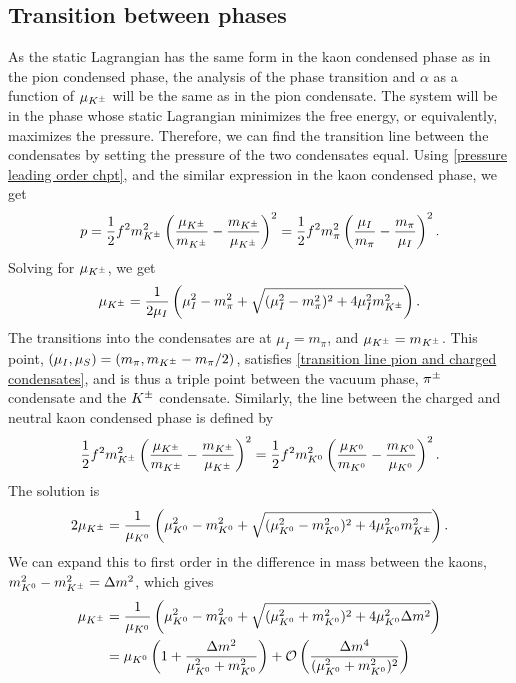 \subsection{Transition between phases}


As the static Lagrangian has the same form in the kaon condensed phase as in the pion condensed phase, the analysis of the phase transition and $\alpha$ as a function of $\mu_{K^\pm}$ will be the same as in the pion condensate.
The system will be in the phase whose static Lagrangian minimizes the free energy, or equivalently, maximizes the pressure.
Therefore, we can find the transition line between the condensates by setting the pressure of the two condensates equal.
Using \autoref{pressure leading order chpt}, and the similar expression in the kaon condensed phase, we get
%
\begin{equation}
    p 
    = \frac{1}{2} f^2 m_{K^\pm}^2 \left( \frac{\mu_{K^\pm}}{m_{K^\pm}} - \frac{m_{K^\pm}}{\mu_{K^\pm}} \right)^2
    =
    \frac{1}{2} f^2m_\pi^2  \left( \frac{\mu_I}{m_\pi} - \frac{m_\pi}{\mu_I} \right)^2.
\end{equation}
%
Solving for $\mu_{K^\pm}$, we get
%
\begin{equation}
    \label{transition line pion and charged condensates}
    \mu_{K^\pm} =\frac{1}{2\mu_I} \left(\mu_I^2 - m_\pi^2  + \sqrt{(\mu_I^2 - m_\pi^2)^2 + 4\mu_I^2 m_{K^\pm}^2}\right).
\end{equation}
%
The transitions into the condensates are at $\mu_I = m_\pi$, and $\mu_{K^\pm} = m_{K^\pm}$.
This point, $(\mu_I, \mu_S) = (m_\pi, m_{K^\pm} - m_\pi/2)$, satisfies \autoref{transition line pion and charged condensates}, and is thus a triple point between the vacuum phase, ${\pi^\pm}$ condensate and the ${K^\pm}$ condensate. 
Similarly, the line between the charged and neutral kaon condensed phase is defined by
%
\begin{equation}
    \frac{1}{2} f^2 m_{K^\pm}^2 \left( \frac{\mu_{K^\pm}}{m_{K^\pm}} - \frac{m_{K^\pm}}{\mu_{K^\pm}} \right)^2
    =
    \frac{1}{2} f^2 m_{K^0}^2 \left( \frac{\mu_{K^0}}{m_{K^0}} - \frac{m_{K^0}}{\mu_{K^0}} \right)^2.
\end{equation}
%
The solution is
%
\begin{equation}
    2 \mu_{K^\pm} 
    = \frac{1}{\mu_{K^0}}
    \left(
        \mu_{K^0}^2 - m_{K^0}^2  + \sqrt{(\mu_{K^0}^2 - m_{K^0}^2)^2 + 4\mu_{K^0}^2m_{K^\pm}^2}
    \right).
\end{equation}
%
We can expand this to first order in the difference in mass between the kaons, $m_{K^0}^2 - m_{K^\pm}^2 = \Delta m^2$, which gives
%
\begin{align}
    \nonumber
    \mu_{K^\pm}
    &= \frac{1}{\mu_{K^0}} 
    \left(
        \mu_{K^0}^2 - m_{K^0}^2 + \sqrt{(\mu_{K^0}^2 + m_{K^0}^2)^2 + 4\mu_{K^0}^2 \Delta m^2}
    \right)\\
    &= \mu_{K^0} \left(1 + \frac{\Delta m^2}{\mu_{K^0}^2 + m_{K^0}^2}\right)
    + \mathcal O\left( \frac{\Delta m^4}{ (\mu_{K^0}^2 + m_{K^0}^2)^2} \right)
\end{align}

